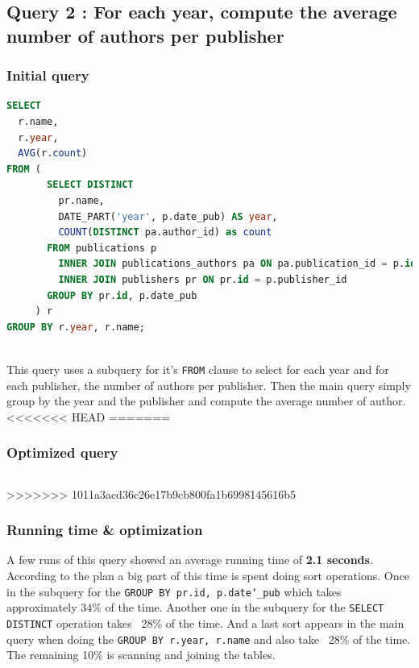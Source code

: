 \documentclass[doubleside, titlepage]{article}
\begin{document}
\subsection{Query 2 : For each year, compute the average number of authors per publisher}

\subsubsection{Initial query}
		\begin{lstlisting}[language=SQL,showspaces=false,basicstyle=\ttfamily,numberstyle=\tiny,commentstyle=\color{gray}]
SELECT
  r.name,
  r.year,
  AVG(r.count)
FROM (
       SELECT DISTINCT
         pr.name,
         DATE_PART('year', p.date_pub) AS year,
         COUNT(DISTINCT pa.author_id) as count
       FROM publications p
         INNER JOIN publications_authors pa ON pa.publication_id = p.id
         INNER JOIN publishers pr ON pr.id = p.publisher_id
       GROUP BY pr.id, p.date_pub
     ) r
GROUP BY r.year, r.name;
		\end{lstlisting}
~\\
This query uses a subquery for it's \texttt{FROM} clause to select for each year and for each publisher, the number of authors per publisher. Then the main query simply group by the year and the publisher and compute the average number of author.~\\

<<<<<<< HEAD
=======
\subsubsection{Optimized query}
		\begin{lstlisting}[language=SQL,showspaces=false,basicstyle=\ttfamily,numberstyle=\tiny,commentstyle=\color{gray}]

		\end{lstlisting}

>>>>>>> 1011a3acd36c26e17b9cb800fa1b6998145616b5
\subsubsection{Running time \& optimization}

A few runs of this query showed an average running time of \textbf{2.1 seconds}. According to the plan a big part of this time is spent doing sort operations. Once in the subquery for the \texttt{GROUP BY pr.id, p.date\char`_pub} which takes approximately 34\% of the time. Another one in the subquery for the \texttt{SELECT DISTINCT} operation takes ~28\% of the time. And a last sort appears in the main query when doing the \texttt{GROUP BY r.year, r.name} and also take ~28\% of the time. The remaining 10\% is scanning and joining the tables.
\end{document}
